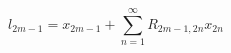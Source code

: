 \begin{equation}\label{eq110:ps}
	l_{2m-1}=x_{2m-1}+\sum^{\infty}_{n=1}R_{2m-1,2n}x_{2n}
\end{equation}

